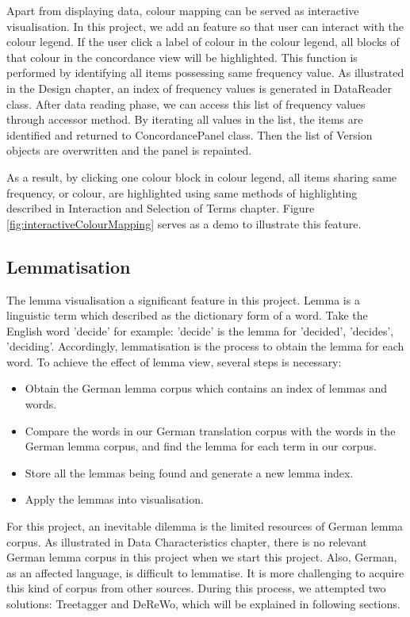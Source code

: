 Apart from displaying data, colour mapping can be served as interactive visualisation. In this project, we add an feature so that user can interact with the colour legend. If the user click a label of colour in the colour legend, all blocks of that colour in the concordance view will be highlighted. This function is performed by identifying all items possessing same frequency value. As illustrated in the Design chapter, an index of frequency values is generated in DataReader class. After data reading phase, we can access this list of frequency values through accessor method. By iterating all values in the list, the items are identified and returned to ConcordancePanel class. Then the list of Version objects are overwritten and the panel is repainted.

As a result, by clicking one colour block in colour legend, all items sharing same frequency, or colour, are highlighted using same methods of highlighting described in Interaction and Selection of Terms chapter. Figure \ref{fig:interactiveColourMapping} serves as a demo to illustrate this feature.

\subsection{Lemmatisation}

The lemma visualisation a significant feature in this project. Lemma is a linguistic term which described as the dictionary form of a word. Take the English word 'decide' for example: 'decide' is the lemma for 'decided', 'decides', 'deciding'. Accordingly, lemmatisation is the process to obtain the lemma for each word. To achieve the effect of lemma view, several steps is necessary:
\begin{itemize}
	\item \textbf{} Obtain the German lemma corpus which contains an index of lemmas and words.
	\item \textbf{} Compare the words in our German translation corpus with the words in the German lemma corpus, and find the lemma for each term in our corpus.
	\item \textbf{} Store all the lemmas being found and generate a new lemma index.
	\item \textbf{} Apply the lemmas into visualisation.
\end{itemize}
For this project, an inevitable dilemma is the limited resources of German lemma corpus. As illustrated in Data Characteristics chapter, there is no relevant German lemma corpus in this project when we start this project. Also, German, as an affected language, is difficult to lemmatise. It is more challenging to acquire this kind of corpus from other sources. During this process, we attempted two solutions: Treetagger and DeReWo, which will be explained in following sections.

